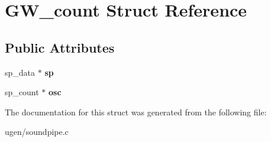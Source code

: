 \hypertarget{structGW__count}{}\section{G\+W\+\_\+count Struct Reference}
\label{structGW__count}
\subsection*{Public Attributes}
\begin{DoxyCompactItemize}
\item 
\hypertarget{structGW__count_af06225100b421e55986278acbdbe644f}{}\label{structGW__count_af06225100b421e55986278acbdbe644f} 
sp\+\_\+data $\ast$ {\bfseries sp}
\item 
\hypertarget{structGW__count_a41f67f39b3e59dbd3994024bfcc58e8f}{}\label{structGW__count_a41f67f39b3e59dbd3994024bfcc58e8f} 
sp\+\_\+count $\ast$ {\bfseries osc}
\end{DoxyCompactItemize}


The documentation for this struct was generated from the following file\+:\begin{DoxyCompactItemize}
\item 
ugen/soundpipe.\+c\end{DoxyCompactItemize}
